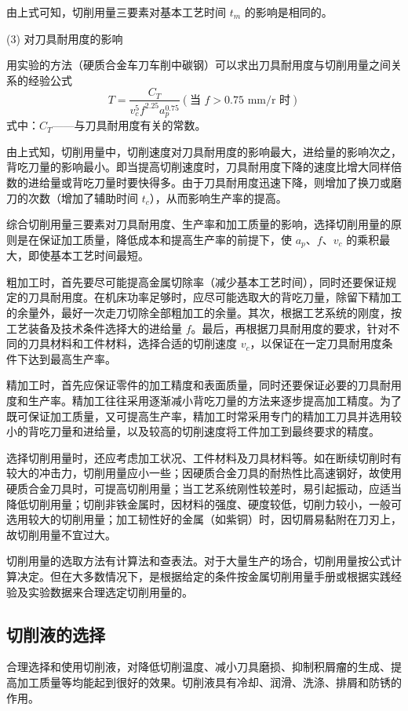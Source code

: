 \documentclass[UTF8]{ctexbook}
\newcommand{\◎}{\ensuremath{\bigcirc}}
\begin{document}
由上式可知，切削用量三要素对基本工艺时间 $t_m$ 的影响是相同的。

(3) 对刀具耐用度的影响

用实验的方法（硬质合金车刀车削中碳钢）可以求出刀具耐用度与切削用量之间关系的经验公式
$$T = \frac{C_T}{v_c^5 f^{2.25} a_p^{0.75}} (\text{当 } f > 0.75 \text{ mm/r 时})$$
式中：$C_T$——与刀具耐用度有关的常数。

由上式知，切削用量中，切削速度对刀具耐用度的影响最大，进给量的影响次之，背吃刀量的影响最小。即当提高切削速度时，刀具耐用度下降的速度比增大同样倍数的进给量或背吃刀量时要快得多。由于刀具耐用度迅速下降，则增加了换刀或磨刀的次数（增加了辅助时间 $t_c$），从而影响生产率的提高。

综合切削用量三要素对刀具耐用度、生产率和加工质量的影响，选择切削用量的原则是在保证加工质量，降低成本和提高生产率的前提下，使 $a_p$、$f$、$v_c$ 的乘积最大，即使基本工艺时间最短。

粗加工时，首先要尽可能提高金属切除率（减少基本工艺时间），同时还要保证规定的刀具耐用度。在机床功率足够时，应尽可能选取大的背吃刀量，除留下精加工的余量外，最好一次走刀切除全部粗加工的余量。其次，根据工艺系统的刚度，按工艺装备及技术条件选择大的进给量 $f$。最后，再根据刀具耐用度的要求，针对不同的刀具材料和工件材料，选择合适的切削速度 $v_c$，以保证在一定刀具耐用度条件下达到最高生产率。

精加工时，首先应保证零件的加工精度和表面质量，同时还要保证必要的刀具耐用度和生产率。精加工往往采用逐渐减小背吃刀量的方法来逐步提高加工精度。为了既可保证加工质量，又可提高生产率，精加工时常采用专门的精加工刀具并选用较小的背吃刀量和进给量，以及较高的切削速度将工件加工到最终要求的精度。

选择切削用量时，还应考虑加工状况、工件材料及刀具材料等。如在断续切削时有较大的冲击力，切削用量应小一些；因硬质合金刀具的耐热性比高速钢好，故使用硬质合金刀具时，可提高切削用量；当工艺系统刚性较差时，易引起振动，应适当降低切削用量；切削非铁金属时，因材料的强度、硬度较低，切削力较小，一般可选用较大的切削用量；加工韧性好的金属（如紫铜）时，因切屑易黏附在刀刃上，故切削用量不宜过大。

切削用量的选取方法有计算法和查表法。对于大量生产的场合，切削用量按公式计算决定。但在大多数情况下，是根据给定的条件按金属切削用量手册或根据实践经验及实验数据来合理选定切削用量的。

\subsection{切削液的选择}
合理选择和使用切削液，对降低切削温度、减小刀具磨损、抑制积屑瘤的生成、提高加工质量等均能起到很好的效果。切削液具有冷却、润滑、洗涤、排屑和防锈的作用。
\end{document}
